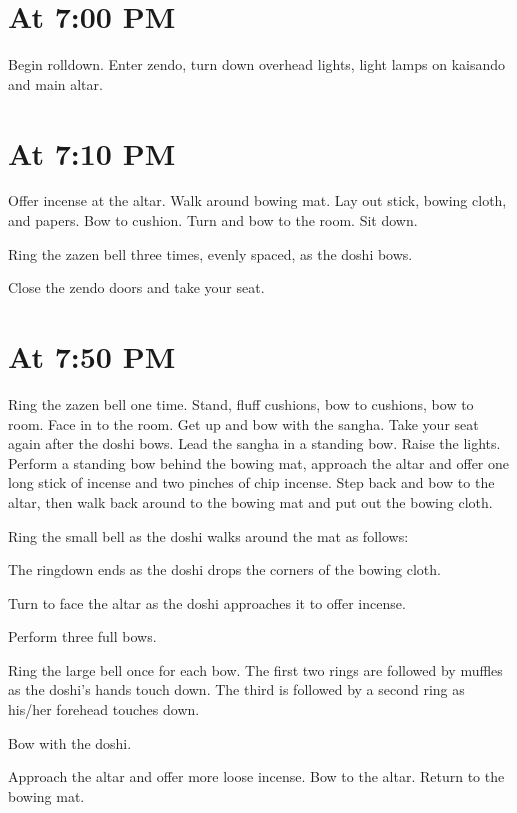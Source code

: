 \documentclass{chantbook}
\begin{document}
\section*{At 7:00 PM}
\tenken Begin rolldown.
\doan Enter zendo, turn down overhead lights, light lamps on kaisando and main
altar.
\section*{At 7:10 PM}

\doshi Offer incense at the altar. Walk around bowing mat. Lay out stick,
bowing cloth, and papers. Bow to cushion. Turn and bow to the room. Sit down.

\doan Ring the zazen bell three times, evenly spaced, as the doshi bows.
\jundoStartZazen

\tenken Close the zendo doors and take your seat.

\section*{At 7:50 PM}
\doan Ring the zazen bell one time. \bigspace\zazenbell
\sangha Stand, fluff cushions, bow to cushions, bow to room. Face in to the
room.
\doan Get up and bow with the sangha. Take your seat again after the doshi
bows.
\doshi Lead the sangha in a standing bow.
\tenken Raise the lights.
\doshi Perform a standing bow behind the bowing mat, approach the altar and
offer one long stick of incense and two pinches of chip incense. Step back and
bow to the altar, then walk back around to the bowing mat and put out the
bowing cloth.

\doan Ring the small bell as the doshi walks around the mat as follows:

\doshiBowingClothRolldown

The ringdown ends as the doshi drops the corners of the bowing cloth.

\kokyo Turn to face the altar as the doshi approaches it to offer incense.

\doshi Perform three full bows.

\doan Ring the large bell once for each bow. The first two rings are followed
by muffles as the doshi's hands touch down. The third is followed by a second
ring as his/her forehead touches down.
\firstBows

\sangha Bow with the doshi.

\doshi Approach the altar and offer more loose incense. Bow to the altar.
Return to the bowing mat.
\end{document}
